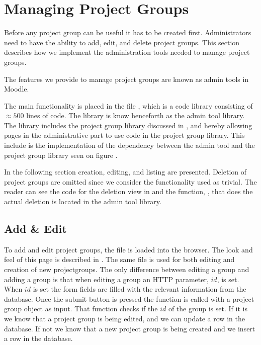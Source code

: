 \section{Managing Project Groups} %
\label{sec:manProjGrpImpl}
Before any project group can be useful it has to be created first.
Administrators need to have the ability to add, edit, and delete project groups.
This section describes how we implement the administration tools needed to manage project groups.

The features we provide to manage project groups are known as admin tools in Moodle.

The main functionality is placed in the file , which is a code library consisting of $\approx 500$ lines of code. 
The library is know henceforth as the admin tool library.
The library includes the project group library discussed in , and hereby allowing pages in the administrative part to use code in the project group library. 
This include is the implementation of the dependency between the admin tool and the project group library seen on figure . 

In the following section creation, editing, and listing are presented. 
Deletion of project groups are omitted since we consider the functionality used as trivial. 
The reader can see the code for the deletion view in  and the function, , that does the actual deletion is located in the admin tool library.

\subsection{Add \& Edit}
To add and edit project groups, the file  is loaded into the browser. 
The look and feel of this page is described in .
The same file is used for both editing and creation of new projectgroups. 
The only difference between editing a group and adding a group is that when editing a group an HTTP parameter, $id$, is set.
When $id$ is set the form fields are filled with the relevant information from the database.
Once the submit button is pressed the function  is called with a project group object as input.
That function checks if the $id$ of the group is set. 
If it is we know that a project group is being edited, and we can update a row in the database.
If not we know that a new project group is being created and we insert a row in the database.

